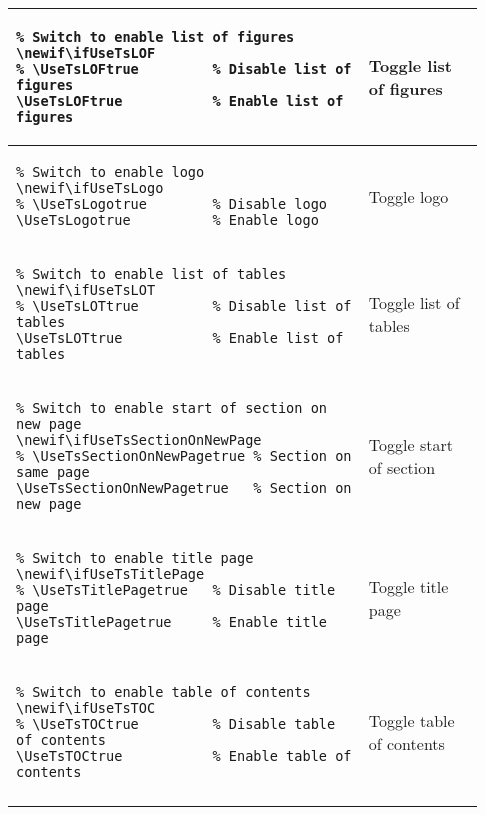 \begin{footnotesize}
\begin{longtable}{ | P{0.7\linewidth} | p{0.23\linewidth} | }
        \hline
        \begin{BVerbatim}
\newif\ifUseTsLOF
\UseTsLOFtrue           %
        \end{BVerbatim}
         & Toggle list \newline of figures   \\
        \hline
        \begin{BVerbatim}
\newif\ifUseTsLogo
\UseTsLogotrue          %
        \end{BVerbatim}
         & Toggle logo                       \\
        \hline
        \begin{BVerbatim}
\newif\ifUseTsLOT
\UseTsLOTtrue           %
        \end{BVerbatim}
         & Toggle list \newline of tables    \\
        \hline
        \begin{BVerbatim}
\newif\ifUseTsSectionOnNewPage
\UseTsSectionOnNewPagetrue   %
        \end{BVerbatim}
         & Toggle start \newline of section  \\
        \hline
        \begin{BVerbatim}
\newif\ifUseTsTitlePage
\UseTsTitlePagetrue     %
        \end{BVerbatim}
         & Toggle title page                 \\
        \hline
        \begin{BVerbatim}
\newif\ifUseTsTOC
\UseTsTOCtrue           %
        \end{BVerbatim}
         & Toggle table \newline of contents \\
        \hline
    \end{longtable}
\end{footnotesize}

